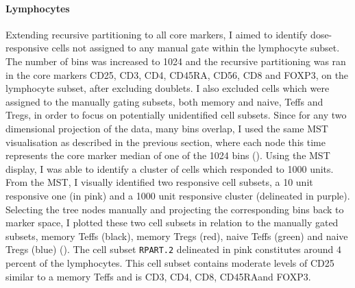 %

\paragraph{Lymphocytes} 
Extending recursive partitioning to all core markers, I aimed to identify dose-responsive cells not assigned to any manual gate within the lymphocyte subset.
The number of bins was increased to 1024 and the recursive partitioning was ran in the core markers CD25, CD3, CD4, CD45RA, CD56, CD8 and FOXP3, on the lymphocyte
subset, after excluding doublets.  I also excluded cells which were assigned to the manually gating subsets, both memory and naive, Teffs and Tregs, in order
to focus on potentially unidentified cell subsets.
Since for any two dimensional projection of the data, many bins overlap, I used the same \gls{MST} visualisation as described in the previous section,
where each node this time represents the core marker median of one of the 1024 bins ().
Using the MST display, I was able to identify a cluster of cells which responded to 1000 units.
From the MST, I visually identified two responsive cell subsets, a 10 unit responsive one (in pink) and a 1000 unit responsive cluster (delineated in purple).
Selecting the tree nodes manually and projecting the corresponding bins back to marker space, I plotted these two cell subsets in relation to the
manually gated subsets, memory Teffs (black), memory Tregs (red), naive Teffs (green) and naive Tregs (blue) ().
The cell subset \texttt{RPART.2} delineated in pink constitutes around $4$ percent of the lymphocytes.
This cell subset contains moderate levels of CD25 similar to a memory Teffs and is CD3\positive, CD4\positive, CD8\negative, CD45RA\negative and FOXP3\negative.
